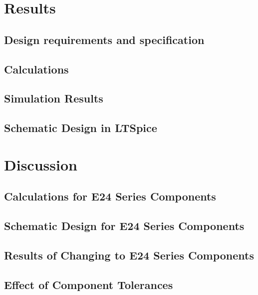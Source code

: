 \documentclass[12pt]{article}
\begin{document}
\section{Results}

\subsection{Design requirements and specification}


\subsection{Calculations}


\subsection{Simulation Results}


\subsection{Schematic Design in LTSpice}


\section{Discussion}

\subsection{Calculations for E24 Series Components}

\subsection{Schematic Design for E24 Series Components}

\subsection{Results of Changing to E24 Series Components}


\subsection{Effect of Component Tolerances}

\end{document}
